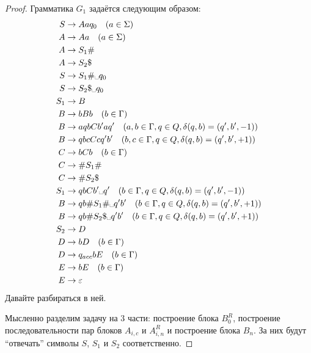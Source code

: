 \documentclass[12pt,a4paper]{article}
\newcommand{\spacesymbol}{\ensuremath{\text{\textvisiblespace}}}
\begin{document}
\begin{proof}
        Грамматика $G_1$ задаётся следующим образом:
        \begin{align*}
            S &\to Aaq_0 \quad (a \in \Sigma)\\
            A &\to Aa \quad (a \in \Sigma)\\
            A &\to S_1 \#\\
            A &\to S_2 \$\\
            S &\to S_1 \# \spacesymbol q_0\\
            S &\to S_2 \$ \spacesymbol q_0\\
            S_1 &\to B\\
            B &\to bBb \quad (b \in \Gamma)\\
            B &\to aqbCb'aq' \quad (a, b \in \Gamma, q \in Q, \delta(q, b) = (q', b', -1))\\
            B &\to qbcCcq'b' \quad (b, c \in \Gamma, q \in Q, \delta(q, b) = (q', b', +1))\\
            C &\to bCb \quad (b \in \Gamma)\\
            C &\to \# S_1 \#\\
            C &\to \# S_2 \$\\
            S_1 &\to qbCb'\spacesymbol q' \quad (b \in \Gamma, q \in Q, \delta(q, b) = (q', b', -1))\\
            B &\to qb\#S_1\#\spacesymbol q'b' \quad (b \in \Gamma, q \in Q, \delta(q, b) = (q', b', +1))\\
            B &\to qb\#S_2\$\spacesymbol q'b' \quad (b \in \Gamma, q \in Q, \delta(q, b) = (q', b', +1))\\
            S_2 &\to D\\
            D &\to bD \quad (b \in \Gamma)\\
            D &\to q_{acc}bE \quad (b \in \Gamma)\\
            E &\to bE \quad (b \in \Gamma)\\
            E &\to \varepsilon
        \end{align*}
        Давайте разбираться в ней.

        Мысленно разделим задачу на 3 части: построение блока $B_0^R$, построение последовательности пар блоков $A_{i, c}$ и $A_{i, n}^R$ и построение блока $B_n$. За них будут ``отвечать'' символы $S$, $S_1$ и $S_2$ соответственно.


\end{proof}
\end{document}
